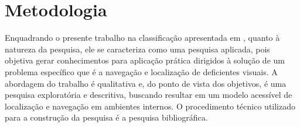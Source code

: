 \documentclass[english,brazilian]{UNISINOSmonografia}
\begin{document}

\chapter{Metodologia}
Enquadrando o presente trabalho na classificação apresentada em , quanto à natureza da pesquisa, ele se caracteriza como uma pesquisa aplicada, pois objetiva gerar conhecimentos para aplicação prática dirigidos à solução de um problema específico que é a navegação e localização de deficientes visuais. A abordagem do trabalho é qualitativa e, do ponto de vista dos objetivos, é uma pesquisa exploratória e descritiva, buscando resultar em um modelo acessível de localização e navegação em ambientes internos. O procedimento técnico utilizado para a construção da pesquisa é a pesquisa bibliográfica.
\end{document}
